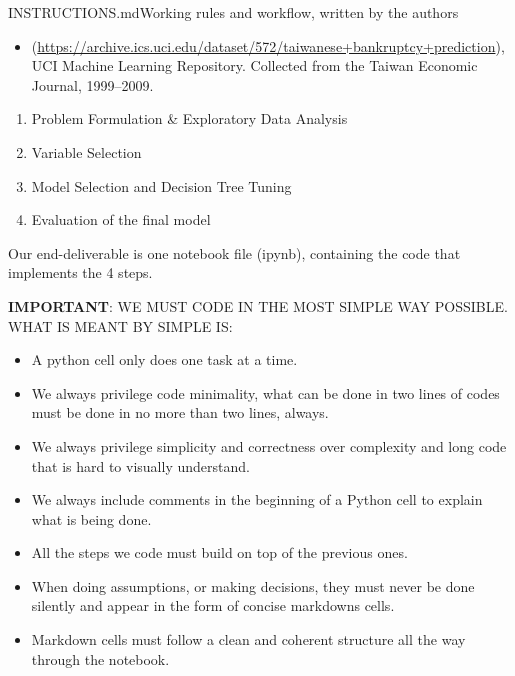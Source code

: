 \begin{mdfile}{INSTRUCTIONS.md}{Working rules and workflow, written by the authors}

\begin{itemize}
\tightlist
\item
  (\url{https://archive.ics.uci.edu/dataset/572/taiwanese+bankruptcy+prediction}), UCI Machine Learning Repository. Collected from the Taiwan Economic Journal, 1999--2009.
\end{itemize}


\begin{enumerate}
\def\labelenumi{\arabic{enumi}.}
\tightlist
\item
  Problem Formulation \& Exploratory Data Analysis
\item
  Variable Selection
\item
  Model Selection and Decision Tree Tuning
\item
  Evaluation of the final model
\end{enumerate}

Our end-deliverable is one notebook file (ipynb), containing the code that implements the 4 steps.

\textbf{IMPORTANT}: WE MUST CODE IN THE MOST SIMPLE WAY POSSIBLE. WHAT IS MEANT BY SIMPLE IS:

\begin{itemize}
\tightlist
\item
  A python cell only does one task at a time.
\item
  We always privilege code minimality, what can be done in two lines of codes must be done in no more than two lines, always.
\item
  We always privilege simplicity and correctness over complexity and long code that is hard to visually understand.
\item
  We always include comments in the beginning of a Python cell to explain what is being done.
\item
  All the steps we code must build on top of the previous ones.
\item
  When doing assumptions, or making decisions, they must never be done silently and appear in the form of concise markdowns cells.
\item
  Markdown cells must follow a clean and coherent structure all the way through the notebook.
\end{itemize}


\end{mdfile}
